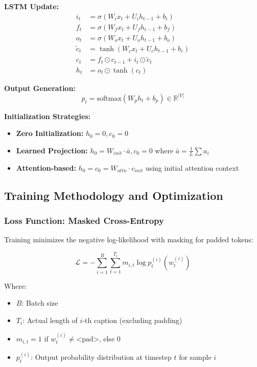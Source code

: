 \documentclass[conference]{IEEEtran}
\begin{document}
\textbf{LSTM Update:}
\begin{align}
i_t &= \sigma(W_i x_t + U_i h_{t-1} + b_i) \\
f_t &= \sigma(W_f x_t + U_f h_{t-1} + b_f) \\
o_t &= \sigma(W_o x_t + U_o h_{t-1} + b_o) \\
\tilde{c}_t &= \tanh(W_c x_t + U_c h_{t-1} + b_c) \\
c_t &= f_t \odot c_{t-1} + i_t \odot \tilde{c}_t \\
h_t &= o_t \odot \tanh(c_t)
\end{align}

\textbf{Output Generation:}
\begin{equation}
p_t = \text{softmax}(W_p h_t + b_p) \in \mathbb{R}^{|V|}
\end{equation}

\textbf{Initialization Strategies:}
\begin{itemize}
  \item \textbf{Zero Initialization:} $h_0 = 0, c_0 = 0$
  \item \textbf{Learned Projection:} $h_0 = W_{init} \cdot \bar{a}, c_0 = 0$ where $\bar{a} = \frac{1}{L} \sum a_i$
  \item \textbf{Attention-based:} $h_0 = c_0 = W_{attn} \cdot c_{init}$ using initial attention context
\end{itemize}

\subsection{Training Methodology and Optimization}
\label{sec:q1_training}

\subsubsection{Loss Function: Masked Cross-Entropy}
\label{sec:q1_loss}

Training minimizes the negative log-likelihood with masking for padded tokens:

\begin{equation}
\mathcal{L} = -\sum_{i=1}^{B} \sum_{t=1}^{T_i} m_{i,t} \log p_t^{(i)}(w_t^{(i)})
\end{equation}

Where:
\begin{itemize}
  \item $B$: Batch size
  \item $T_i$: Actual length of $i$-th caption (excluding padding)
  \item $m_{i,t} = 1$ if $w_t^{(i)} \neq \text{<pad>}$, else $0$
  \item $p_t^{(i)}$: Output probability distribution at timestep $t$ for sample $i$
\end{itemize}
\end{document}
